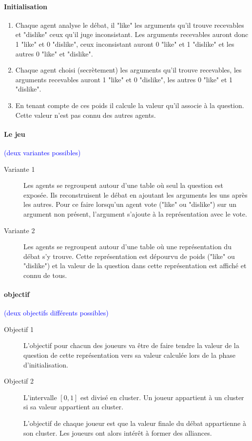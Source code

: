 \documentclass[12pt]{article}
\theoremstyle{defi}
\theoremstyle{not}
\theoremstyle{prob}
\begin{document}
  \paragraph{Initialisation}
  \begin{enumerate}
\color{blue}
    \item Chaque agent analyse le débat, il "like" les arguments qu'il trouve recevables et "dislike" ceux qu'il juge inconsistant.
    Les arguments recevables auront donc 1 "like" et 0 "dislike", ceux inconsistant auront 0 "like" et 1 "dislike" et les autres 0 "like" et "dislike".
\color{red}
    \item Chaque agent choisi (secrètement) les arguments qu'il trouve recevables, les arguments recevables auront 1 "like" et 0 "dislike", les autres 0 "like" et 1 "dislike".
\color{black}
    \item En tenant compte de ces poids il calcule la valeur qu'il associe à la question. Cette valeur n'est pas connu des autres agents.
  \end{enumerate}

  \paragraph{Le jeu}\textcolor{blue}{(deux variantes possibles)}

\color{blue}
    \begin{description}
      \item[Variante 1] Les agents se regroupent autour d'une table où seul la question est exposée. Ils reconstruisent le débat en ajoutant les arguments les uns après les autres. Pour ce faire lorsqu'un agent vote ("like" ou "dislike") sur un argument non présent, l'argument s'ajoute à la représentation avec le vote.

\color{black}
      \item[Variante 2] Les agents se regroupent autour d'une table où une représentation du débat s'y trouve. Cette représentation est dépourvu de poids ("like" ou "dislike") et la valeur de la question dans cette représentation est affiché et connu de tous.
    \end{description}
\color{black}
  \paragraph{objectif\\}\textcolor{blue}{(deux objectifs différents possibles)}
  \begin{description}
    \item[Objectif 1] L'objectif pour chacun des joueurs va être de faire tendre la valeur de la question de cette représentation vers sa valeur calculée lors de la phase d'initialisation.
\color{blue}
    \item[Objectif 2] L'intervalle $[0, 1]$ est divisé en cluster. Un joueur appartient à un cluster si sa valeur appartient au cluster.

    L'objectif de chaque joueur est que la valeur finale du débat appartienne à son cluster. Les joueurs ont alors intérêt à former des alliances.
\color{black}
  \end{description}
\end{document}
